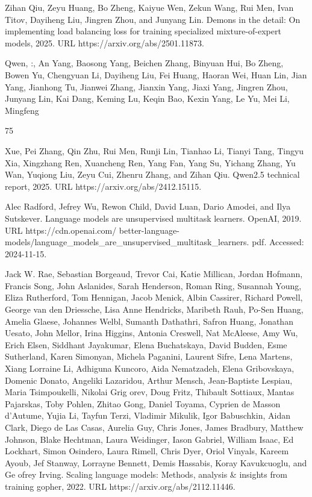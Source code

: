 \documentclass[
  10
]{article}
\begin{document}
Zihan Qiu, Zeyu Huang, Bo Zheng, Kaiyue Wen, Zekun Wang, Rui Men, Ivan
Titov, Dayiheng Liu, Jingren Zhou, and Junyang Lin. Demons in the
detail: On implementing load balancing loss for training specialized
mixture-of-expert models, 2025. URL https://arxiv.org/abs/2501.11873.

Qwen, :, An Yang, Baosong Yang, Beichen Zhang, Binyuan Hui, Bo Zheng,
Bowen Yu, Chengyuan Li, Dayiheng Liu, Fei Huang, Haoran Wei, Huan Lin,
Jian Yang, Jianhong Tu, Jianwei Zhang, Jianxin Yang, Jiaxi Yang, Jingren
Zhou, Junyang Lin, Kai Dang, Keming Lu, Keqin Bao, Kexin Yang, Le Yu,
Mei Li, Mingfeng

75

Xue, Pei Zhang, Qin Zhu, Rui Men, Runji Lin, Tianhao Li, Tianyi Tang,
Tingyu Xia, Xingzhang Ren, Xuancheng Ren, Yang Fan, Yang Su, Yichang
Zhang, Yu Wan, Yuqiong Liu, Zeyu Cui, Zhenru Zhang, and Zihan Qiu.
Qwen2.5 technical report, 2025. URL https://arxiv.org/abs/2412.15115.

Alec Radford, Jefrey Wu, Rewon Child, David Luan, Dario Amodei, and Ilya
Sutskever. Language models are unsupervised multitask learners. OpenAI,
2019. URL https://cdn.openai.com/
better-language-models/language\_models\_are\_unsupervised\_multitask\_learners.
pdf. Accessed: 2024-11-15.

Jack W. Rae, Sebastian Borgeaud, Trevor Cai, Katie Millican, Jordan
Hofmann, Francis Song, John Aslanides, Sarah Henderson, Roman Ring,
Susannah Young, Eliza Rutherford, Tom Hennigan, Jacob Menick, Albin
Cassirer, Richard Powell, George van den Driessche, Lisa Anne Hendricks,
Maribeth Rauh, Po-Sen Huang, Amelia Glaese, Johannes Welbl, Sumanth
Dathathri, Safron Huang, Jonathan Uesato, John Mellor, Irina Higgins,
Antonia Creswell, Nat McAleese, Amy Wu, Erich Elsen, Siddhant Jayakumar,
Elena Buchatskaya, David Budden, Esme Sutherland, Karen Simonyan,
Michela Paganini, Laurent Sifre, Lena Martens, Xiang Lorraine Li,
Adhiguna Kuncoro, Aida Nematzadeh, Elena Gribovskaya, Domenic Donato,
Angeliki Lazaridou, Arthur Mensch, Jean-Baptiste Lespiau, Maria
Tsimpoukelli, Nikolai Grig orev, Doug Fritz, Thibault Sottiaux, Mantas
Pajarskas, Toby Pohlen, Zhitao Gong, Daniel Toyama, Cyprien de Masson
d'Autume, Yujia Li, Tayfun Terzi, Vladimir Mikulik, Igor Babuschkin,
Aidan Clark, Diego de Las Casas, Aurelia Guy, Chris Jones, James
Bradbury, Matthew Johnson, Blake Hechtman, Laura Weidinger, Iason
Gabriel, William Isaac, Ed Lockhart, Simon Osindero, Laura Rimell, Chris
Dyer, Oriol Vinyals, Kareem Ayoub, Jef Stanway, Lorrayne Bennett, Demis
Hassabis, Koray Kavukcuoglu, and Ge ofrey Irving. Scaling language
models: Methods, analysis \& insights from training gopher, 2022. URL
https://arxiv.org/abs/2112.11446.
\end{document}
